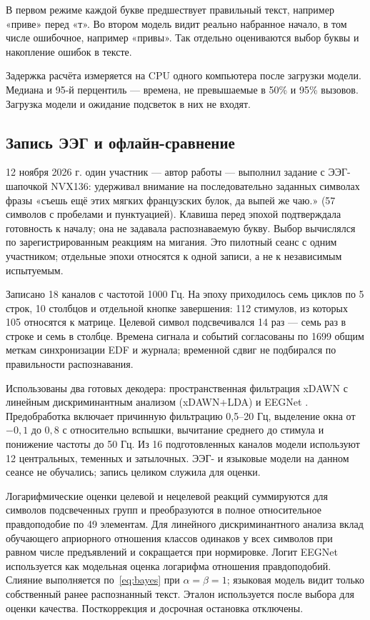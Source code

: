 \documentclass[11pt,a4paper]{article}
\begin{document}
В первом режиме каждой букве предшествует правильный текст, например «приве» перед «т». Во втором модель видит реально набранное начало, в том числе ошибочное, например «привы». Так отдельно оцениваются выбор буквы и накопление ошибок в тексте.

Задержка расчёта измеряется на CPU одного компьютера после загрузки модели. Медиана и 95-й перцентиль --- времена, не превышаемые в 50\% и 95\% вызовов. Загрузка модели и ожидание подсветок в них не входят.


\subsection{Запись ЭЭГ и офлайн-сравнение}
12 ноября 2026 г. один участник --- автор работы --- выполнил задание с ЭЭГ-шапочкой NVX136: удерживал внимание на последовательно заданных символах фразы «съешь ещё этих мягких французских булок, да выпей же чаю.» (57 символов с пробелами и пунктуацией). Клавиша перед эпохой подтверждала готовность к началу; она не задавала распознаваемую букву. Выбор вычислялся по зарегистрированным реакциям на мигания. Это пилотный сеанс с одним участником; отдельные эпохи относятся к одной записи, а не к независимым испытуемым.

Записано 18 каналов с частотой 1000 Гц. На эпоху приходилось семь циклов по 5 строк, 10 столбцов и отдельной кнопке завершения: 112 стимулов, из которых 105 относятся к матрице. Целевой символ подсвечивался 14 раз --- семь раз в строке и семь в столбце. Времена сигнала и событий согласованы по 1699 общим меткам синхронизации EDF и журнала; временной сдвиг не подбирался по правильности распознавания.

Использованы два готовых декодера: пространственная фильтрация xDAWN с линейным дискриминантным анализом (xDAWN+LDA) \citep{rivet2009} и EEGNet \citep{lawhern2018}. Предобработка включает причинную фильтрацию 0,5--20 Гц, выделение окна от $-0{,}1$ до $0{,}8$ с относительно вспышки, вычитание среднего до стимула и понижение частоты до 50 Гц. Из 16 подготовленных каналов модели используют 12 центральных, теменных и затылочных. ЭЭГ- и языковые модели на данном сеансе не обучались; запись целиком служила для оценки.

Логарифмические оценки целевой и нецелевой реакций суммируются для символов подсвеченных групп и преобразуются в полное относительное правдоподобие по 49 элементам. Для линейного дискриминантного анализа вклад обучающего априорного отношения классов одинаков у всех символов при равном числе предъявлений и сокращается при нормировке. Логит EEGNet используется как модельная оценка логарифма отношения правдоподобий. Слияние выполняется по~\eqref{eq:bayes} при $\alpha=\beta=1$; языковая модель видит только собственный ранее распознанный текст. Эталон используется после выбора для оценки качества. Посткоррекция и досрочная остановка отключены.
\end{document}
